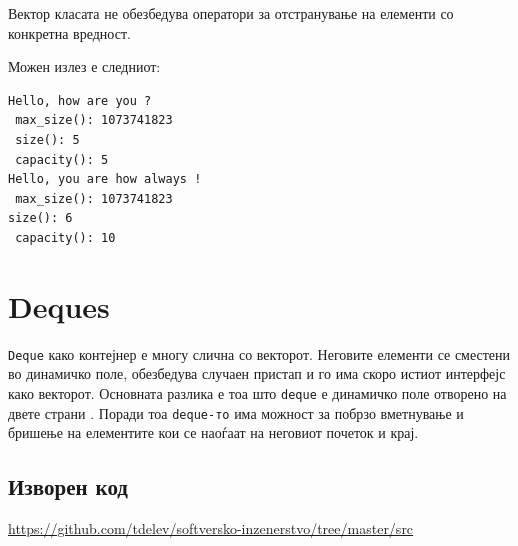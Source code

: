 Вектор класата не обезбедува оператори за отстранување на елементи со конкретна
вредност.



Можен излез е следниот:
\begin{verbatim}
Hello, how are you ? 
 max_size(): 1073741823
 size(): 5
 capacity(): 5
Hello, you are how always ! 
 max_size(): 1073741823
size(): 6
 capacity(): 10
\end{verbatim}


\section{Deques}

\texttt{Deque} како контејнер е многу слична со векторот. Неговите елементи се
сместени во динамичко поле, обезбедува случаен пристап и го има скоро истиот
интерфејс како векторот. Основната разлика е тоа што \texttt{deque} е динамичко
поле отворено на двете страни . Поради тоа \texttt{deque-то} има можност за
побрзо вметнување и бришење на елементите кои се наоѓаат на неговиот почеток и крај.


\subsection{Изворен код}
\href{https://github.com/tdelev/softversko-inzenerstvo/tree/master/src}{https://github.com/tdelev/softversko-inzenerstvo/tree/master/src}


